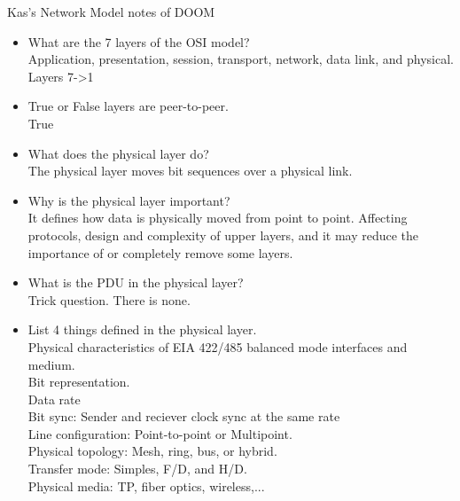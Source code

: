 
\begin{center}
    Kas's Network Model notes of DOOM
\end{center}

\begin{itemize}
    \item What are the 7 layers of the OSI model?\\
    Application, presentation, session, transport, network, data link, and physical.
    Layers 7->1\\
    \item True or False layers are peer-to-peer.\\
        True\\
    \item What does the physical layer do?\\
    The physical layer moves bit sequences over a physical link.

    \item Why is the physical layer important?\\
    It defines how data is physically moved from point to point. Affecting protocols,
    design and complexity of upper layers, and it may reduce the importance of or 
    completely remove some layers.

    \item What is the PDU in the physical layer?\\
    Trick question. There is none.

    \item List 4 things defined in the physical layer.\\
    Physical characteristics of EIA 422/485 balanced mode interfaces and medium.\\
    Bit representation.\\

    Data rate\\

    Bit sync: Sender and reciever clock sync at the same rate\\

    Line configuration: Point-to-point or Multipoint.\\

    Physical topology: Mesh, ring, bus, or hybrid.\\

    Transfer mode: Simples, F/D, and H/D.\\

    Physical media: TP, fiber optics, wireless,...\\


\end{itemize}
